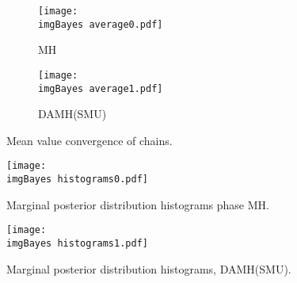 \documentclass{article}
\newcommand{\imgBayes}{saved_samples/config_mcmc_bayes/img_Bayes/}
\begin{document}
\cleardoublepage
\begin{figure}[htb!]
    \centering
    \begin{subfigure}[t]{\textwidth}
      \texttt{[image: \\imgBayes average0.pdf]}
      \caption{MH}
    \end{subfigure}
    \begin{subfigure}[t]{\textwidth}
      \texttt{[image: \\imgBayes average1.pdf]}
      \caption{DAMH(SMU)}
    \end{subfigure}

    \caption{Mean value convergence of chains.}
    \label{fig:average}
\end{figure}


\begin{figure}[htb!]
    \centering
    \texttt{[image: \\imgBayes histograms0.pdf]}
    \caption{Marginal posterior distribution histograms phase MH.}
    \label{fig:posterior_histogram}
\end{figure}

\begin{figure}[htb!]
    \centering
    \texttt{[image: \\imgBayes histograms1.pdf]}
    \caption{Marginal posterior distribution histograms, DAMH(SMU).}
    \label{fig:posterior_histogram}
\end{figure}
\end{document}
